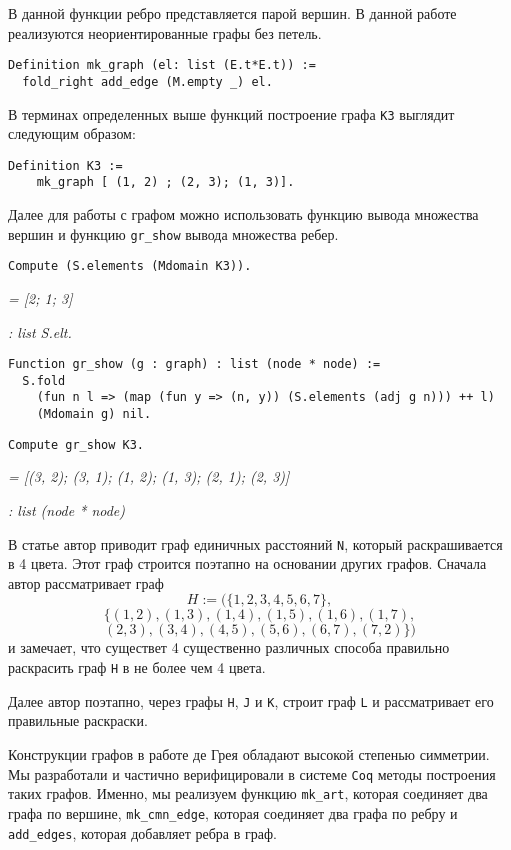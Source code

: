 В данной функции ребро представляется парой вершин.
В данной работе реализуются неориентированные графы без петель.

\begin{verbatim}
Definition mk_graph (el: list (E.t*E.t)) :=
  fold_right add_edge (M.empty _) el.
\end{verbatim}

В терминах определенных выше функций построение графа {\tt K3} выглядит следующим образом:
\begin{verbatim}
Definition K3 := 
    mk_graph [ (1, 2) ; (2, 3); (1, 3)].
\end{verbatim}

Далее для работы с графом можно использовать функцию вывода множества вершин и функцию {\tt gr\_show} вывода множества ребер.
\begin{verbatim}
Compute (S.elements (Mdomain K3)).
\end{verbatim}
{\it = [2; 1; 3]}

{\it    : list S.elt.}

\begin{verbatim}
Function gr_show (g : graph) : list (node * node) :=
  S.fold 
    (fun n l => (map (fun y => (n, y)) (S.elements (adj g n))) ++ l) 
    (Mdomain g) nil.
\end{verbatim}

\begin{verbatim}
Compute gr_show K3.
\end{verbatim}
{\it = [(3, 2); (3, 1); (1, 2); (1, 3); (2, 1); (2, 3)] }

{\it   : list (node * node) }

В статье \cite{deGrey} автор приводит граф единичных расстояний {\tt N}, который раскрашивается в 4 цвета. Этот граф строится поэтапно на основании других графов. Сначала автор рассматривает граф $$H := (\{1, 2, 3, 4, 5, 6, 7 \},$$
    $$ \{(1, 2), (1, 3), (1, 4), (1, 5), (1, 6), (1, 7), $$
    $$ (2, 3), (3, 4), (4, 5), (5, 6), (6, 7), (7, 2)\}) $$ и замечает, что существет 4 существенно различных способа правильно раскрасить граф {\tt H} в не более чем 4 цвета.
    
Далее автор поэтапно, через графы {\tt H}, {\tt J} и {\tt K}, строит граф {\tt L} и рассматривает его правильные раскраски.

Конструкции графов в работе де Грея обладают
высокой степенью симметрии. Мы разработали и частично верифицировали в
системе {\tt Coq} методы построения таких графов. Именно, мы реализуем
функцию {\tt mk\_art}, которая соединяет два графа по вершине, {\tt mk\_cmn\_edge}, которая соединяет два графа по ребру и {\tt add\_edges}, которая добавляет ребра в граф.

